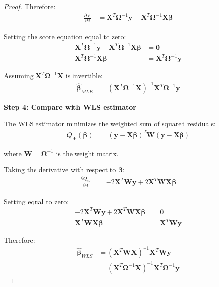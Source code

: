 \documentclass{article}
\begin{document}
\begin{proof}
Therefore:
\begin{align}
\frac{\partial \ell}{\partial \boldsymbol{\beta}} &= \mathbf{X}^T\boldsymbol{\Omega}^{-1}\mathbf{y} - \mathbf{X}^T\boldsymbol{\Omega}^{-1}\mathbf{X}\boldsymbol{\beta} \label{eq:hetero_score}
\end{align}

Setting the score equation equal to zero:
\begin{align}
\mathbf{X}^T\boldsymbol{\Omega}^{-1}\mathbf{y} - \mathbf{X}^T\boldsymbol{\Omega}^{-1}\mathbf{X}\boldsymbol{\beta} &= \mathbf{0} \nonumber\\
\mathbf{X}^T\boldsymbol{\Omega}^{-1}\mathbf{X}\boldsymbol{\beta} &= \mathbf{X}^T\boldsymbol{\Omega}^{-1}\mathbf{y}
\end{align}

Assuming $\mathbf{X}^T\boldsymbol{\Omega}^{-1}\mathbf{X}$ is invertible:
\begin{align}
\hat{\boldsymbol{\beta}}_{MLE} &= (\mathbf{X}^T\boldsymbol{\Omega}^{-1}\mathbf{X})^{-1}\mathbf{X}^T\boldsymbol{\Omega}^{-1}\mathbf{y} \label{eq:hetero_mle}
\end{align}

\textbf{Step 4: Compare with WLS estimator}

The WLS estimator minimizes the weighted sum of squared residuals:
\begin{align}
Q_W(\boldsymbol{\beta}) &= (\mathbf{y} - \mathbf{X}\boldsymbol{\beta})^T\mathbf{W}(\mathbf{y} - \mathbf{X}\boldsymbol{\beta}) \label{eq:wls_objective}
\end{align}

where $\mathbf{W} = \boldsymbol{\Omega}^{-1}$ is the weight matrix.

Taking the derivative with respect to $\boldsymbol{\beta}$:
\begin{align}
\frac{\partial Q_W}{\partial \boldsymbol{\beta}} &= -2\mathbf{X}^T\mathbf{W}\mathbf{y} + 2\mathbf{X}^T\mathbf{W}\mathbf{X}\boldsymbol{\beta}
\end{align}

Setting equal to zero:
\begin{align}
-2\mathbf{X}^T\mathbf{W}\mathbf{y} + 2\mathbf{X}^T\mathbf{W}\mathbf{X}\boldsymbol{\beta} &= \mathbf{0} \nonumber\\
\mathbf{X}^T\mathbf{W}\mathbf{X}\boldsymbol{\beta} &= \mathbf{X}^T\mathbf{W}\mathbf{y}
\end{align}

Therefore:
\begin{align}
\hat{\boldsymbol{\beta}}_{WLS} &= (\mathbf{X}^T\mathbf{W}\mathbf{X})^{-1}\mathbf{X}^T\mathbf{W}\mathbf{y} \nonumber\\
&= (\mathbf{X}^T\boldsymbol{\Omega}^{-1}\mathbf{X})^{-1}\mathbf{X}^T\boldsymbol{\Omega}^{-1}\mathbf{y} \label{eq:wls_beta}
\end{align}


\end{proof}
\end{document}
